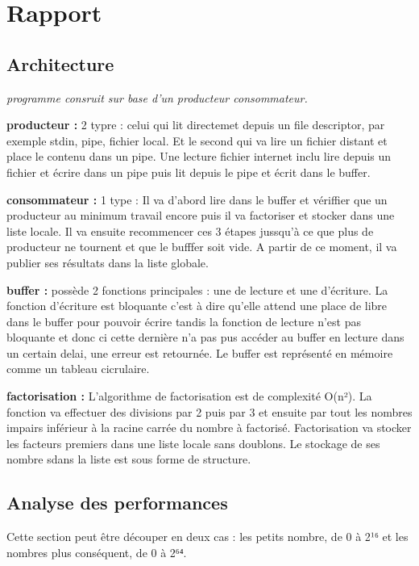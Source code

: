 \chapter{Rapport}

\section{Architecture}

	\textit{programme consruit sur base d'un producteur consommateur.}
	
		\textbf{producteur : }
			2 typre : celui qui lit directemet depuis un file descriptor, par exemple stdin, pipe, fichier local. Et le second qui va lire un fichier distant et place le contenu dans un pipe. Une lecture fichier internet inclu lire depuis un fichier et écrire dans un pipe puis lit depuis le pipe et écrit dans le buffer.
			
		\textbf{consommateur :}
			1 type : Il va d'abord lire dans le buffer et vériffier que un producteur au minimum travail encore puis il va factoriser et stocker dans une liste locale. Il va ensuite recommencer ces 3 étapes jussqu'à ce que plus de producteur ne tournent et que le bufffer soit vide. A partir de ce moment, il va publier ses résultats dans la liste globale.
			
		\textbf{buffer :}
			possède 2 fonctions principales : une de lecture et une d'écriture. La fonction d'écriture est bloquante c'est à dire qu'elle attend une place de libre dans le buffer pour pouvoir écrire tandis la fonction de lecture n'est pas bloquante et donc ci cette dernière n'a pas pus accéder au buffer en lecture dans un certain delai, une erreur est retournée. Le buffer est représenté en mémoire comme un tableau cicrulaire.
			
		\textbf{factorisation : }
			L'algorithme de factorisation est de complexité O(n²). La fonction va effectuer des divisions par 2 puis par 3 et ensuite par tout les nombres impairs inférieur à la racine carrée du nombre à factorisé. Factorisation va stocker les facteurs premiers dans une liste locale sans doublons. Le stockage de ses nombre sdans la liste est sous forme de structure.
			

\section{Analyse des performances}


	Cette section peut être découper en deux cas : les petits nombre, de 0 à 2¹⁶ et les nombres plus conséquent, de 0 à 2⁶⁴.

